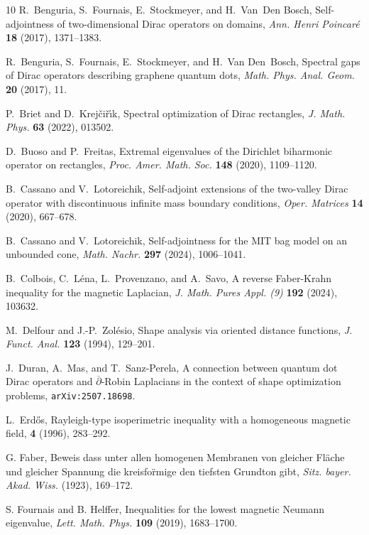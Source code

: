 \documentclass[11pt,a4paper]{amsart}
\numberwithin{figure}{section}
\numberwithin{equation}{section}
\theoremstyle{plain}%
\theoremstyle{remark}
\theoremstyle{plain}
\begin{document}
\begin{thebibliography}{10}
	R.~Benguria, S.~Fournais, E.~Stockmeyer, and H.~Van~Den
	Bosch, Self-adjointness of two-dimensional {Dirac} operators on domains, {\em Ann. Henri Poincar{\'e}} {\bf 18} (2017), 1371--1383.
	
	R.~Benguria, S.~Fournais, E.~Stockmeyer, and H.~Van
	Den~Bosch, Spectral gaps of {Dirac} operators describing graphene quantum dots,
	{\em Math. Phys. Anal. Geom.} {\bf 20} (2017), 11.
	
	P.~Briet and D.~Krej{\v{c}}i{\v{r}}{\'{\i}}k,
	Spectral optimization of {Dirac} rectangles,
	{\em J. Math. Phys.} {\bf 63} (2022), 013502.
	
	D.~Buoso and P.~Freitas, Extremal eigenvalues of the Dirichlet biharmonic operator on rectangles,
	{\it Proc. Amer. Math. Soc.} {
	\bf 148} (2020), 1109--1120.
	
	B.~Cassano and V.~Lotoreichik,
	Self-adjoint extensions of the two-valley {Dirac} operator with discontinuous infinite mass boundary conditions,
	{\em Oper. Matrices}  {\bf 14} (2020), 667--678.
	
	B.~Cassano and V.~Lotoreichik,
	Self-adjointness for the {MIT} bag model on an unbounded cone,
	{\em Math. Nachr.} {\bf 297} (2024), 1006--1041.
	
	B.~Colbois, C.~L\'{e}na, L.~Provenzano, and A.~Savo,
	A reverse Faber-Krahn inequality for the magnetic Laplacian,
	{\it J. Math. Pures Appl. (9)} {\bf 192} (2024),  103632.
	
	M.~Delfour and J.-P.~Zol\'{e}sio, Shape analysis via oriented distance functions, {\it J. Funct. Anal.} {\bf 123} (1994), 129--201.
	
	J.~Duran, A.~Mas, and T.~Sanz-Perela, A connection between quantum dot Dirac operators and $\overline\partial $-Robin Laplacians in the context of shape optimization problems, \texttt{arXiv:2507.18698}. 
	
	L.~Erd\H{o}s,
	Rayleigh-type isoperimetric inequality with a homogeneous magnetic field,
	 {\bf 4} (1996),
	283--292.
	
	 G. Faber, Beweis dass unter allen homogenen Membranen von gleicher Fl\"ache und gleicher Spannung die 
	kreisfo\"rmige den tiefsten Grundton gibt, {\it Sitz. bayer. Akad. Wiss.} (1923), 169--172.
	
	S. Fournais and B. Helffer,
	Inequalities for the lowest magnetic Neumann eigenvalue,
	{\it Lett. Math. Phys.} {\bf 109} (2019), 1683--1700.
	

\end{thebibliography}
\end{document}
